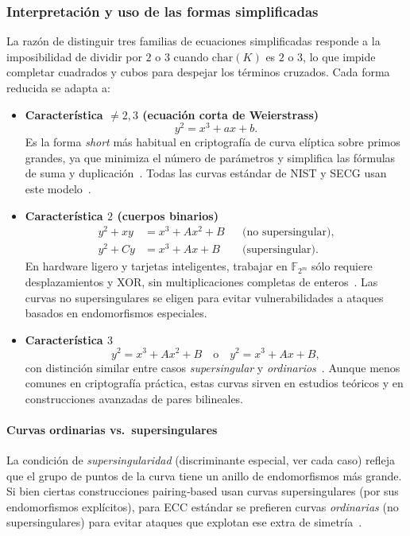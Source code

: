 \subsubsection*{Interpretación y uso de las formas simplificadas}

La razón de distinguir tres familias de ecuaciones simplificadas responde a la imposibilidad de dividir por \(2\) o \(3\) cuando \(\mathrm{char}(K)\) es \(2\) o \(3\), lo que impide completar cuadrados y cubos para despejar los términos cruzados. Cada forma reducida se adapta a:
\begin{itemize}
  \item \textbf{Característica \(\neq2,3\) (ecuación corta de Weierstrass)}  
    \[
      y^2 = x^3 + ax + b.
    \]
    Es la forma \emph{short} más habitual en criptografía de curva elíptica sobre primos grandes, ya que minimiza el número de parámetros y simplifica las fórmulas de suma y duplicación~\cite{silverman1986aec}. Todas las curvas estándar de NIST y SECG usan este modelo~\cite{nist-sp800-186}.
  \item \textbf{Característica \(2\) (cuerpos binarios)}  
    \begin{align*}
      y^2 + x y &= x^3 + A x^2 + B
      &&\text{(no supersingular)},\\
      y^2 + C y &= x^3 + A x + B
      &&\text{(supersingular)}.
    \end{align*}
    En hardware ligero y tarjetas inteligentes, trabajar en \(\mathbb{F}_{2^m}\) sólo requiere desplazamientos y XOR, sin multiplicaciones completas de enteros~\cite{koblitz1987}. Las curvas no supersingulares se eligen para evitar vulnerabilidades a ataques basados en endomorfismos especiales.
  \item \textbf{Característica \(3\)}  
    \[
      y^2 = x^3 + A x^2 + B
      \quad\text{o}\quad
      y^2 = x^3 + A x + B,
    \]
    con distinción similar entre casos \emph{supersingular} y \emph{ordinarios}~\cite{silverman1986aec}. Aunque menos comunes en criptografía práctica, estas curvas sirven en estudios teóricos y en construcciones avanzadas de pares bilineales.
\end{itemize}

\paragraph{Curvas ordinarias vs.\ supersingulares}  
La condición de \emph{supersingularidad} (discriminante especial, ver cada caso) refleja que el grupo de puntos de la curva tiene un anillo de endomorfismos más grande. Si bien ciertas construcciones pairing‐based usan curvas supersingulares (por sus endomorfismos explícitos), para ECC estándar se prefieren curvas \emph{ordinarias} (no supersingulares) para evitar ataques que explotan ese extra de simetría~\cite{waterhouse1969}.  


